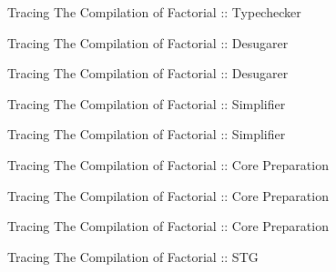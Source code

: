\documentclass{beamer}
\begin{document}

\begin{frame}{Tracing The Compilation of Factorial :: Typechecker}
  \tiny
  
\end{frame}


\begin{frame}{Tracing The Compilation of Factorial :: Desugarer}
  \tiny
  
\end{frame}

\begin{frame}{Tracing The Compilation of Factorial :: Desugarer}
  \tiny
  
\end{frame}


\begin{frame}{Tracing The Compilation of Factorial :: Simplifier}
  \tiny
  
\end{frame}

\begin{frame}{Tracing The Compilation of Factorial :: Simplifier}
  \tiny
  
\end{frame}


\begin{frame}{Tracing The Compilation of Factorial :: Core Preparation}
  \tiny
  
\end{frame}

\begin{frame}{Tracing The Compilation of Factorial :: Core Preparation}
  \tiny
  
\end{frame}

\begin{frame}{Tracing The Compilation of Factorial :: Core Preparation}
  \tiny
  
\end{frame}


\begin{frame}{Tracing The Compilation of Factorial :: STG}
  \tiny
  
\end{frame}
\end{document}

